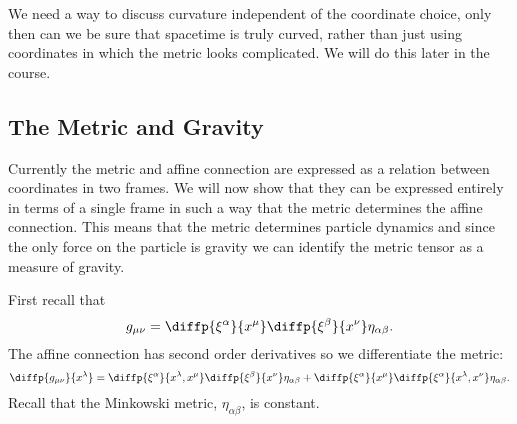 \documentclass[fleqn]{NotesClass}
\begin{document}
    We need a way to discuss curvature independent of the coordinate choice, only then can we be sure that spacetime is truly curved, rather than just using coordinates in which the metric looks complicated.
    We will do this later in the course.
    
    \subsection{The Metric and Gravity}
    Currently the metric and affine connection are expressed as a relation between coordinates in two frames.
    We will now show that they can be expressed entirely in terms of a single frame in such a way that the metric determines the affine connection.
    This means that the metric determines particle dynamics and since the only force on the particle is gravity we can identify the metric tensor as a measure of gravity.
    
    First recall that
    \begin{equation}
        g_{\mu\nu} = \diffp{\xi^\alpha}{x^\mu}\diffp{\xi^\beta}{x^\nu}\eta_{\alpha\beta}.
    \end{equation}
    The affine connection has second order derivatives so we differentiate the metric:
    \begin{equation}
        \diffp{g_{\mu\nu}}{x^\lambda} = \diffp{\xi^\alpha}{x^\lambda, x^\mu} \diffp{\xi^\beta}{x^\nu} \eta_{\alpha\beta} + \diffp{\xi^\alpha}{x^\mu}\diffp{\xi^\alpha}{x^\lambda, x^\nu} \eta_{\alpha\beta}.
    \end{equation}
    Recall that the Minkowski metric, \(\eta_{\alpha\beta}\), is constant.
    
\end{document}

